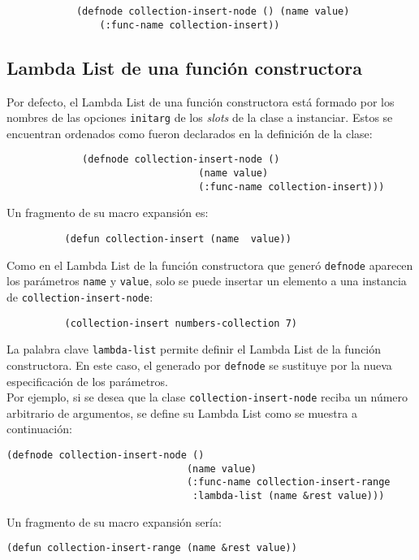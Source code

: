 \begin{verbatim}
	        (defnode collection-insert-node () (name value) 
	            (:func-name collection-insert))
\end{verbatim}

\subsection{Lambda List de una función constructora}
Por defecto, el Lambda List de una función constructora está formado por los nombres de las opciones \texttt{initarg} de los \textit{slots} de la clase a instanciar. Estos se encuentran ordenados como fueron declarados en la definición de la clase:\\ 

\begin{verbatim}
	         (defnode collection-insert-node () 
	                             (name value)
	                             (:func-name collection-insert)))
\end{verbatim}
Un fragmento de su macro expansión es:
\begin{verbatim}
          (defun collection-insert (name  value))
\end{verbatim}
Como en el Lambda List de la función constructora que generó \texttt{defnode} aparecen los parámetros \texttt{name} y \texttt{value}, solo se puede insertar un elemento a una instancia de \texttt{collection-insert-node}:

\begin{verbatim}
          (collection-insert numbers-collection 7)
\end{verbatim}
		
La palabra clave \texttt{lambda-list} permite definir el Lambda List de la función constructora. En este caso, el generado por \texttt{defnode} se sustituye por la nueva especificación de los parámetros.\\
 
Por ejemplo, si se desea que la clase \texttt{collection-insert-node} reciba un número arbitrario de argumentos, se define su Lambda List como se muestra a continuación:
\begin{verbatim}
(defnode collection-insert-node () 
                               (name value) 
                               (:func-name collection-insert-range 
                                :lambda-list (name &rest value)))
\end{verbatim}
Un fragmento de su macro expansión sería:
\begin{verbatim}
(defun collection-insert-range (name &rest value))
\end{verbatim}

